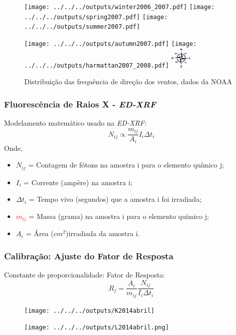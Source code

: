 \begin{frame}
  \frametitle{}
  \begin{figure}[H]
    \centering
      \texttt{[image: ../../../outputs/winter2006\_2007.pdf]}
      \texttt{[image: ../../../outputs/spring2007.pdf]}
      \texttt{[image: ../../../outputs/summer2007.pdf]}
  \end{figure}

  \begin{figure}[H]
    \centering
      \texttt{[image: ../../../outputs/autumn2007.pdf]}
      \texttt{[image: ../../../outputs/harmattan2007\_2008.pdf]}
      \includegraphics[width=1cm]{../../../inputs/images/rosa_ventos}
      \caption{Distribuição das frequência de direção dos ventos, dados da NOAA}
  \end{figure}
\end{frame}

\begin{frame}
  \frametitle{Fluorescência de Raios X - \textit{ED-XRF}}
  Modelamento matemático usado na \textit{ED-XRF}:
  \begin{equation}
	  N_{ij} \propto \frac{m_{ij}}{A_i}I_i{\Delta}t_{i}
  \end{equation}
  Onde,  
  \begin{itemize}
    \item $N_{ij}$ = Contagem de fótons na amostra i para o elemento químico j;
    \item $I_{i}$ = Corrente (ampère) na amostra i;
    \item $\Delta t_i$ = Tempo vivo (segundos) que a amostra i foi irradiada;
    \item \textcolor{red}{$m_{ij}$} = Massa (grama) na amostra i para o elemento químico j;
    \item $A_i$ = Área ($cm^2$)irradiada da amostra i.
  \end{itemize}
\end{frame}

\begin{frame}
  \frametitle{Calibração: Ajuste do Fator de Resposta}
  Constante de proporcionalidade: Fator de Resposta:
  \begin{equation}
    R_j = \frac{A_i}{m_{ij}} \frac{N_{ij}}{I_i \Delta t_i}
  \end{equation}
  \begin{figure}[H]
  \centering
    \begin{minipage}[b]{0.40\linewidth}
      \texttt{[image: ../../../outputs/K2014abril]}
    \end{minipage}
    \quad
    \begin{minipage}[b]{0.40\linewidth}
      \texttt{[image: ../../../outputs/L2014abril.png]}
    \end{minipage}
  \end{figure}
\end{frame}


